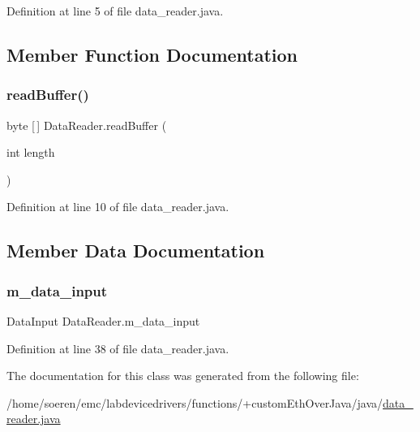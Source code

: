 Definition at line 5 of file data\+\_\+reader.\+java.



\subsection{Member Function Documentation}
\mbox{\label{class_data_reader_acaae40eacf15bd8f1d08d898897efe96}} 
\subsubsection{\texorpdfstring{read\+Buffer()}{readBuffer()}}
{\footnotesize\ttfamily byte \mbox{[}$\,$\mbox{]} Data\+Reader.\+read\+Buffer (\begin{DoxyParamCaption}\item[{int}]{length }\end{DoxyParamCaption})\hspace{0.3cm}{\ttfamily [inline]}}



Definition at line 10 of file data\+\_\+reader.\+java.



\subsection{Member Data Documentation}
\mbox{\label{class_data_reader_aaf3507ee4846ef2793bf4bb568018c25}} 
\subsubsection{\texorpdfstring{m\+\_\+data\+\_\+input}{m\_data\_input}}
{\footnotesize\ttfamily Data\+Input Data\+Reader.\+m\+\_\+data\+\_\+input\hspace{0.3cm}{\ttfamily [private]}}



Definition at line 38 of file data\+\_\+reader.\+java.



The documentation for this class was generated from the following file\+:\begin{DoxyCompactItemize}
\item 
/home/soeren/emc/labdevicedrivers/functions/+custom\+Eth\+Over\+Java/java/\hyperlink{data__reader_8java}{data\+\_\+reader.\+java}\end{DoxyCompactItemize}
